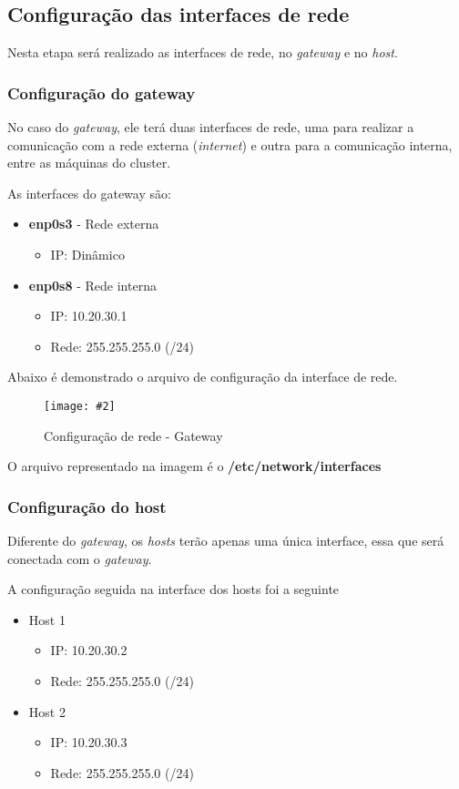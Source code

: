 \documentclass[
	12pt,				%
	openany,			%
	a4paper,			%
	chapter=TITLE,		%
	section=TITLE,		%
	english,
	brazil				%
]{abntex2}
\newcommand{\includeImage}[3] {

\begin{figure}[H]
 	 \centering
  		\texttt{[image: \#2]}
  	\caption{#3}
\end{figure}

}
\begin{document}
\subsection{Configuração das interfaces de rede}

Nesta etapa será realizado as interfaces de rede, no \textit{gateway} e no \textit{host}.

\subsubsection{Configuração do gateway}

No caso do \textit{gateway}, ele terá duas interfaces de rede, uma para realizar a comunicação com a rede externa (\textit{internet}) e outra para a comunicação interna, entre as máquinas do cluster.

As interfaces do gateway são:
\begin{itemize}
	\item \textbf{enp0s3} - Rede externa
		\begin{itemize}
			\item IP: Dinâmico
		\end{itemize}
	\item \textbf{enp0s8} - Rede interna
		\begin{itemize}
			\item IP: 10.20.30.1
			\item Rede: 255.255.255.0 (/24)
		\end{itemize}
\end{itemize}

Abaixo é demonstrado o arquivo de configuração da interface de rede.

\includeImage{0.5}{imgs/2_configuracao_rede/gateway/1.png}{Configuração de rede - Gateway}

O arquivo representado na imagem é o \textbf{/etc/network/interfaces}

\subsubsection{Configuração do host}

Diferente do \textit{gateway}, os \textit{hosts} terão apenas uma única interface, essa que será conectada com o \textit{gateway}.

A configuração seguida na interface dos hosts foi a seguinte
\begin{itemize}
	\item Host 1
		\begin{itemize}
			\item IP: 10.20.30.2
			\item Rede: 255.255.255.0 (/24)
		\end{itemize}
	\item Host 2
		\begin{itemize}
			\item IP: 10.20.30.3
			\item Rede: 255.255.255.0 (/24)
		\end{itemize}
\end{itemize}
\end{document}
